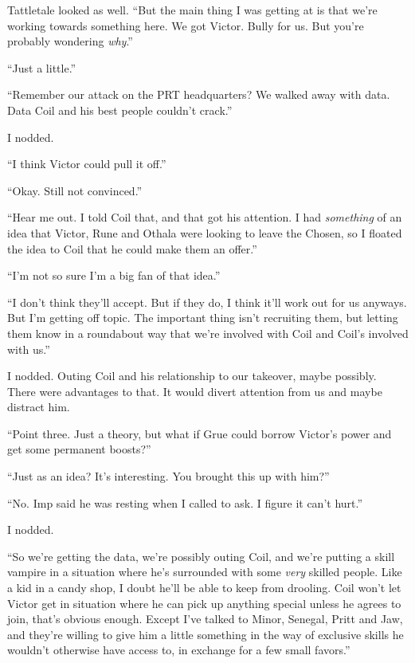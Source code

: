 Tattletale looked as well.  ``But the main thing I was getting at is that we're working towards something here.  We got Victor.  Bully for us.  But you're probably wondering \emph{why}.''



``Just a little.''



``Remember our attack on the PRT headquarters?  We walked away with data.  Data Coil and his best people couldn't crack.''



I nodded.



``I think Victor could pull it off.''



``Okay.  Still not convinced.''



``Hear me out.  I told Coil that, and that got his attention.  I had \emph{something} of an idea that Victor, Rune and Othala were looking to leave the Chosen, so I floated the idea to Coil that he could make them an offer.''



``I'm not so sure I'm a big fan of that idea.''



``I don't think they'll accept.  But if they do, I think it'll work out for us anyways.  But I'm getting off topic.  The important thing isn't recruiting them, but letting them know in a roundabout way that we're involved with Coil and Coil's involved with us.''



I nodded.  Outing Coil and his relationship to our takeover, maybe possibly.  There were advantages to that.  It would divert attention from us and maybe distract him.



``Point three.  Just a theory, but what if Grue could borrow Victor's power and get some permanent boosts?''



``Just as an idea?  It's interesting.  You brought this up with him?''



``No.  Imp said he was resting when I called to ask.  I figure it can't hurt.''



I nodded.



``So we're getting the data, we're possibly outing Coil, and we're putting a skill vampire in a situation where he's surrounded with some \emph{very} skilled people.  Like a kid in a candy shop, I doubt he'll be able to keep from drooling.  Coil won't let Victor get in situation where he can pick up anything special unless he agrees to join, that's obvious enough.  Except I've talked to Minor, Senegal, Pritt and Jaw, and they're willing to give him a little something in the way of exclusive skills he wouldn't otherwise have access to, in exchange for a few small favors.''




